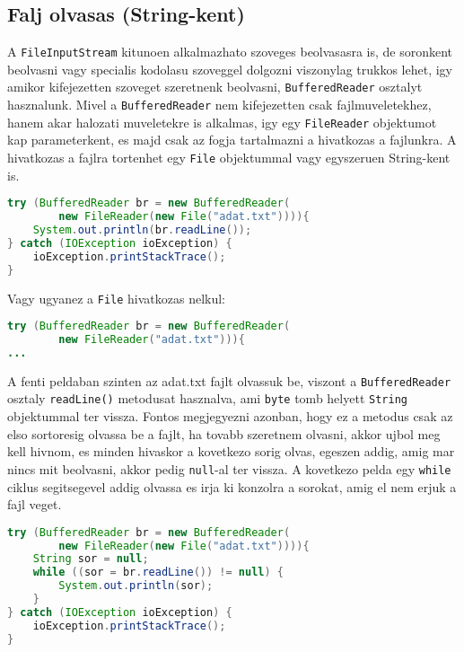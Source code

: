 \documentclass{article}
\let\l\lstinline
\begin{document}
\newpage

\subsection{Falj olvasas (String-kent)}

A \l{FileInputStream} kitunoen alkalmazhato szoveges beolvasasra is, de soronkent beolvasni vagy specialis kodolasu szoveggel dolgozni viszonylag trukkos lehet, igy amikor kifejezetten szoveget szeretnenk beolvasni, \l{BufferedReader} osztalyt hasznalunk. Mivel a \l{BufferedReader} nem kifejezetten csak fajlmuveletekhez, hanem akar halozati muveletekre is alkalmas, igy egy \l{FileReader} objektumot kap parameterkent, es majd csak az fogja tartalmazni a hivatkozas a fajlunkra. A hivatkozas a fajlra tortenhet egy \l{File} objektummal vagy egyszeruen String-kent is.

\begin{lstlisting}[language=Java, caption=BufferedReader hasznalata]
try (BufferedReader br = new BufferedReader(
        new FileReader(new File("adat.txt")))){
    System.out.println(br.readLine());
} catch (IOException ioException) {
    ioException.printStackTrace();
}
\end{lstlisting}

Vagy ugyanez a \l{File} hivatkozas nelkul:

\begin{lstlisting}[language=Java, caption=BufferedReader hasznalata]
try (BufferedReader br = new BufferedReader(
        new FileReader("adat.txt"))){
...
\end{lstlisting}

A fenti peldaban szinten az adat.txt fajlt olvassuk be, viszont a \l{BufferedReader} osztaly \l{readLine()} metodusat hasznalva, ami \l{byte} tomb helyett \l{String} objektummal ter vissza. Fontos megjegyezni azonban, hogy ez a metodus csak az elso sortoresig olvassa be a fajlt, ha tovabb szeretnem olvasni, akkor ujbol meg kell hivnom, es minden hivaskor a kovetkezo sorig olvas, egeszen addig, amig mar nincs mit beolvasni, akkor pedig \l{null}-al ter vissza. A kovetkezo pelda egy \l{while} ciklus segitsegevel addig olvassa es irja ki konzolra a sorokat, amig el nem erjuk a fajl veget.

\begin{lstlisting}[language=Java, caption=BufferedReader hasznalata]
try (BufferedReader br = new BufferedReader(
        new FileReader(new File("adat.txt")))){
    String sor = null;
    while ((sor = br.readLine()) != null) {
        System.out.println(sor);
    }
} catch (IOException ioException) {
    ioException.printStackTrace();
}
\end{lstlisting}
\end{document}
